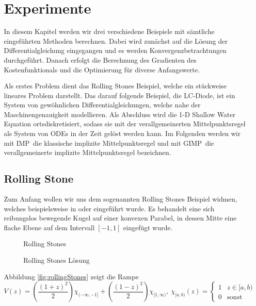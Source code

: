 \chapter{Experimente}\label{ch:experiments}
In diesem Kapitel werden wir drei verschiedene Beispiele mit sämtliche eingeführten Methoden berechnen. Dabei wird zunächst auf die Lösung der Differentialgleichung eingegangen und es werden Konvergenzbetrachtungen durchgeführt. Danach erfolgt die Berechnung des Gradienten des Kostenfunktionals und die Optimierung für diverse Anfangswerte.

Als erstes Problem dient das Rolling Stones Beispiel, welche ein stückweise lineares Problem darstellt. 
Das darauf folgende Beispiel, die LC-Diode, ist ein System von gewöhnlichen Differentialgleichungen, welche nahe der Maschinengenauigkeit modellieren. Als Abschluss wird die 1-D Shallow Water Equation ortsdiskretisiert, sodass sie mit der verallgemeinerten Mittelpunktsregel als System von ODEs in der Zeit gelöst werden kann. Im Folgenden werden wir mit \glqq IMP\grqq~die klassische implizite Mittelpunktsregel und mit \glqq GIMP\grqq~die verallgemeinerte implizite Mittelpunktsregel bezeichnen.

\section{Rolling Stone}\label{sec:rollingStonesExample}
Zum Anfang wollen wir uns dem sogenannten Rolling Stones Beispiel widmen, welches beispielsweise in \cite{boeck2014experiments} oder \cite{hasenfelder13} eingeführt wurde. 
Es behandelt eine sich reibungslos bewegende Kugel auf einer konvexen Parabel, in dessen Mitte eine flache Ebene auf dem Intervall $[-1,1]$ eingefügt wurde. 
\begin{figure}[ht]
\centering
\begin{minipage}[b]{0.49\linewidth}

\caption{Rolling Stones}
\label{fig:rollingStones}
\end{minipage}
\begin{minipage}[b]{0.49\linewidth}

\caption{Rolling Stones Lösung}
\label{fig:rollingStonesSolution}
\end{minipage}
\end{figure}
Abbildung \ref{fig:rollingStones} zeigt die Rampe
\[
 V(z) = \left(\frac{(1+z)^2}{2}\right)\chi_{(-\infty,-1]} + \left(\frac{(1-z)^2}{2}\right)\chi_{[1,\infty)} ,
 ~ \chi_{[a,b)}(z) = 
 \begin{cases}
  1 & z \in [a,b)\\
  0 & \text{sonst}
 \end{cases}
\]


